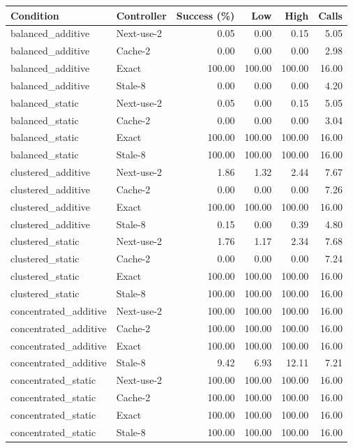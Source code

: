 \begin{longtable}{llrrrr}
\toprule
Condition & Controller & Success (\%) & Low & High & Calls\\
\midrule
\endhead
balanced\_additive & Next-use-2 & 0.05 & 0.00 & 0.15 & 5.05\\
balanced\_additive & Cache-2 & 0.00 & 0.00 & 0.00 & 2.98\\
balanced\_additive & Exact & 100.00 & 100.00 & 100.00 & 16.00\\
balanced\_additive & Stale-8 & 0.00 & 0.00 & 0.00 & 4.20\\
balanced\_static & Next-use-2 & 0.05 & 0.00 & 0.15 & 5.05\\
balanced\_static & Cache-2 & 0.00 & 0.00 & 0.00 & 3.04\\
balanced\_static & Exact & 100.00 & 100.00 & 100.00 & 16.00\\
balanced\_static & Stale-8 & 100.00 & 100.00 & 100.00 & 16.00\\
clustered\_additive & Next-use-2 & 1.86 & 1.32 & 2.44 & 7.67\\
clustered\_additive & Cache-2 & 0.00 & 0.00 & 0.00 & 7.26\\
clustered\_additive & Exact & 100.00 & 100.00 & 100.00 & 16.00\\
clustered\_additive & Stale-8 & 0.15 & 0.00 & 0.39 & 4.80\\
clustered\_static & Next-use-2 & 1.76 & 1.17 & 2.34 & 7.68\\
clustered\_static & Cache-2 & 0.00 & 0.00 & 0.00 & 7.24\\
clustered\_static & Exact & 100.00 & 100.00 & 100.00 & 16.00\\
clustered\_static & Stale-8 & 100.00 & 100.00 & 100.00 & 16.00\\
concentrated\_additive & Next-use-2 & 100.00 & 100.00 & 100.00 & 16.00\\
concentrated\_additive & Cache-2 & 100.00 & 100.00 & 100.00 & 16.00\\
concentrated\_additive & Exact & 100.00 & 100.00 & 100.00 & 16.00\\
concentrated\_additive & Stale-8 & 9.42 & 6.93 & 12.11 & 7.21\\
concentrated\_static & Next-use-2 & 100.00 & 100.00 & 100.00 & 16.00\\
concentrated\_static & Cache-2 & 100.00 & 100.00 & 100.00 & 16.00\\
concentrated\_static & Exact & 100.00 & 100.00 & 100.00 & 16.00\\
concentrated\_static & Stale-8 & 100.00 & 100.00 & 100.00 & 16.00\\
\bottomrule
\end{longtable}